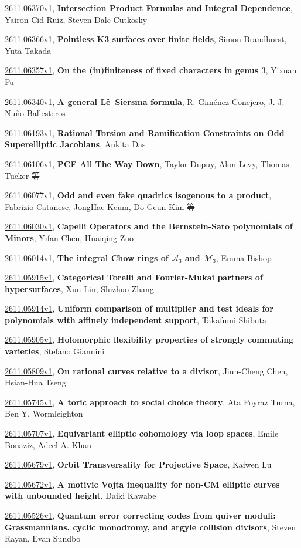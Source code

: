 \documentclass[9pt, a4paper]{article}
\theoremstyle{plain}
\theoremstyle{definition}
\theoremstyle{remark}
\newcommand{\arxiv}[3]{\href{https://arxiv.org/abs/#1}{#1}, \textbf{\textcolor{arxivblue}{#2}}, #3}
\begin{document}
\arxiv{2611.06370v1}{Intersection Product Formulas and Integral Dependence}{Yairon Cid-Ruiz, Steven Dale Cutkosky}

\arxiv{2611.06366v1}{Pointless K3 surfaces over finite fields}{Simon Brandhorst, Yuta Takada}

\arxiv{2611.06357v1}{On the (in)finiteness of fixed characters in genus $3$}{Yixuan Fu}

\arxiv{2611.06340v1}{A general Lê--Siersma formula}{R. Giménez Conejero, J. J. Nuño-Ballesteros}

\arxiv{2611.06193v1}{Rational Torsion and Ramification Constraints on Odd Superelliptic Jacobians}{Ankita Das}

\arxiv{2611.06106v1}{PCF All The Way Down}{Taylor Dupuy, Alon Levy, Thomas Tucker 等}

\arxiv{2611.06077v1}{Odd and even fake quadrics isogenous to a product}{Fabrizio Catanese, JongHae Keum, Do Geun Kim 等}

\arxiv{2611.06030v1}{Capelli Operators and the Bernstein-Sato polynomials of Minors}{Yifan Chen, Huaiqing Zuo}

\arxiv{2611.06014v1}{The integral Chow rings of $\mathcal A_3$ and $\mathcal M_3$}{Emma Bishop}

\arxiv{2611.05915v1}{Categorical Torelli and Fourier-Mukai partners of hypersurfaces}{Xun Lin, Shizhuo Zhang}

\arxiv{2611.05914v1}{Uniform comparison of multiplier and test ideals for polynomials with affinely independent support}{Takafumi Shibuta}

\arxiv{2611.05905v1}{Holomorphic flexibility properties of strongly commuting varieties}{Stefano Giannini}

\arxiv{2611.05809v1}{On rational curves relative to a divisor}{Jiun-Cheng Chen, Hsian-Hua Tseng}

\arxiv{2611.05745v1}{A toric approach to social choice theory}{Ata Poyraz Turna, Ben Y. Wormleighton}

\arxiv{2611.05707v1}{Equivariant elliptic cohomology via loop spaces}{Emile Bouaziz, Adeel A. Khan}

\arxiv{2611.05679v1}{Orbit Transversality for Projective Space}{Kaiwen Lu}

\arxiv{2611.05672v1}{A motivic Vojta inequality for non-CM elliptic curves with unbounded height}{Daiki Kawabe}

\arxiv{2611.05526v1}{Quantum error correcting codes from quiver moduli: Grassmannians, cyclic monodromy, and argyle collision divisors}{Steven Rayan, Evan Sundbo}
\end{document}
